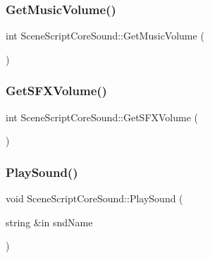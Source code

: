 \hypertarget{class_scene_script_core_sound_aca87f1d2aa9c85ad6e1b14fc1b273c3d}{}\label{class_scene_script_core_sound_aca87f1d2aa9c85ad6e1b14fc1b273c3d} 
\subsubsection{\texorpdfstring{Get\+Music\+Volume()}{GetMusicVolume()}}
{\footnotesize\ttfamily int Scene\+Script\+Core\+Sound\+::\+Get\+Music\+Volume (\begin{DoxyParamCaption}{ }\end{DoxyParamCaption})}

\hypertarget{class_scene_script_core_sound_a239fa72d0cb855dbc792e477f05eba12}{}\label{class_scene_script_core_sound_a239fa72d0cb855dbc792e477f05eba12} 
\subsubsection{\texorpdfstring{Get\+S\+F\+X\+Volume()}{GetSFXVolume()}}
{\footnotesize\ttfamily int Scene\+Script\+Core\+Sound\+::\+Get\+S\+F\+X\+Volume (\begin{DoxyParamCaption}{ }\end{DoxyParamCaption})}

\hypertarget{class_scene_script_core_sound_aa0169492bc4adbb81f3502794f80fbcc}{}\label{class_scene_script_core_sound_aa0169492bc4adbb81f3502794f80fbcc} 
\subsubsection{\texorpdfstring{Play\+Sound()}{PlaySound()}}
{\footnotesize\ttfamily void Scene\+Script\+Core\+Sound\+::\+Play\+Sound (\begin{DoxyParamCaption}\item[{string \&in}]{snd\+Name }\end{DoxyParamCaption})}

\hypertarget{class_scene_script_core_sound_a15e54703f9a6a80f347205fbe407c585}{}\label{class_scene_script_core_sound_a15e54703f9a6a80f347205fbe407c585} 
